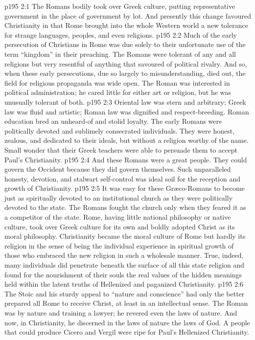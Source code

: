 \vs p195 2:1 The Romans bodily took over Greek culture, putting representative government in the place of government by lot. And presently this change favoured Christianity in that Rome brought into the whole Western world a new tolerance for strange languages, peoples, and even religions.
\vs p195 2:2 Much of the early persecution of Christians in Rome was due solely to their unfortunate use of the term “kingdom” in their preaching. The Romans were tolerant of any and all religions but very resentful of anything that savoured of political rivalry. And so, when these early persecutions, due so largely to misunderstanding, died out, the field for religious propaganda was wide open. The Roman was interested in political administration; he cared little for either art or religion, but he was unusually tolerant of both.
\vs p195 2:3 Oriental law was stern and arbitrary; Greek law was fluid and artistic; Roman law was dignified and respect\hyp{}breeding. Roman education bred an unheard\hyp{}of and stolid loyalty. The early Romans were politically devoted and sublimely consecrated individuals. They were honest, zealous, and dedicated to their ideals, but without a religion worthy of the name. Small wonder that their Greek teachers were able to persuade them to accept Paul’s Christianity.
\vs p195 2:4 And these Romans were a great people. They could govern the Occident because they did govern themselves. Such unparalleled honesty, devotion, and stalwart self\hyp{}control was ideal soil for the reception and growth of Christianity.
\vs p195 2:5 It was easy for these Gr\ae co\hyp{}Romans to become just as spiritually devoted to an institutional church as they were politically devoted to the state. The Romans fought the church only when they feared it as a competitor of the state. Rome, having little national philosophy or native culture, took over Greek culture for its own and boldly adopted Christ as its moral philosophy. Christianity became the moral culture of Rome but hardly its religion in the sense of being the individual experience in spiritual growth of those who embraced the new religion in such a wholesale manner. True, indeed, many individuals did penetrate beneath the surface of all this state religion and found for the nourishment of their souls the real values of the hidden meanings held within the latent truths of Hellenized and paganized Christianity.
\vs p195 2:6 \pc The Stoic and his sturdy appeal to “nature and conscience” had only the better prepared all Rome to receive Christ, at least in an intellectual sense. The Roman was by nature and training a lawyer; he revered even the laws of nature. And now, in Christianity, he discerned in the laws of nature the laws of God. A people that could produce Cicero and Vergil were ripe for Paul’s Hellenized Christianity.
